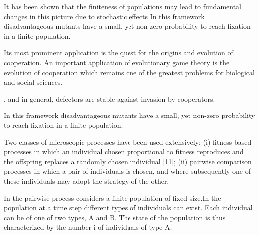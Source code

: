 \documentclass[11pt]{article}
\theoremstyle{plainCl1}
\theoremstyle{plainCl2}
\begin{document}
It has been shown that the finiteness of populations may lead to fundamental
changes in this picture due to stochastic effects In this framework
disadvantageous mutants have a small, yet non-zero probability to reach fixation
in a finite population.


Its most prominent application is the quest for the origins and 
evolution of cooperation.
An important application of evolutionary game theory is the evolution of
cooperation which remains one of the greatest problems for biological and social
sciences.





 , and 
in general, defectors are stable against invasion by cooperators.



In this framework disadvantageous mutants have a small, yet non-zero probability
to reach fixation in a finite population. 

Two classes of microscopic processes have been used extensively: (i)
fitness-based processes in which an individual chosen proportional to fitness
reproduces and the offspring replaces a randomly chosen individual [11]; (ii)
pairwise comparison processes in which a pair of individuals is chosen, and
where subsequently one of these individuals may adopt the strategy of the other.

In the pairwise process considers a finite population of fixed size.In the
population at a time step different types of individuals can exist. 
Each individual can be of one of two types, A and B. The state of the population
is thus characterized by the number i of individuals of type A. 
\end{document}
